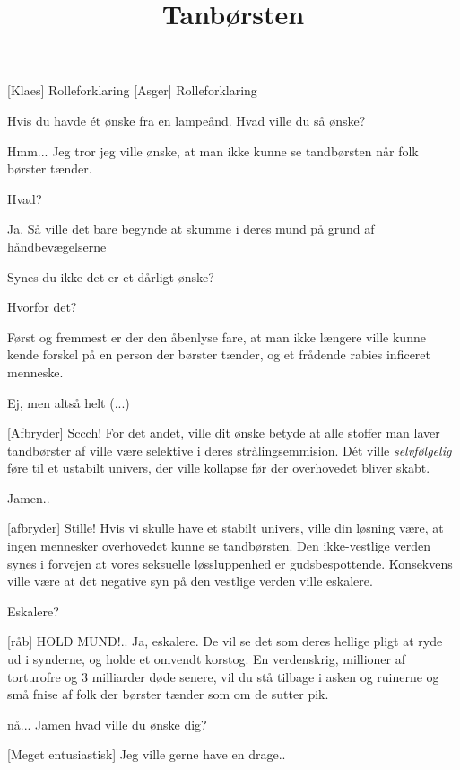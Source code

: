 \documentclass[a4paper,11pt]{article}
\title{Tanbørsten}
\begin{document}
\maketitle

\begin{roles}
    [Klaes] Rolleforklaring
    [Asger] Rolleforklaring
\end{roles}

\begin{sketch}


 Hvis du havde ét ønske fra en lampeånd. Hvad ville du så ønske?

 Hmm...  Jeg tror jeg ville ønske, at man ikke kunne se tandbørsten når folk børster tænder.

 Hvad?

 Ja. Så ville det bare begynde at skumme i deres mund på grund af håndbevægelserne 

 Synes du ikke det er et dårligt ønske?

 Hvorfor det?

 Først og fremmest er der den åbenlyse fare, at man ikke længere ville kunne kende forskel på en person der børster tænder, og et frådende rabies inficeret menneske.

 Ej, men altså helt (...)

[Afbryder] Sccch! For det andet, ville dit ønske betyde at alle stoffer man laver tandbørster af ville være selektive i deres strålingsemmision. Dét ville \emph{selvfølgelig} føre til et ustabilt univers, der ville kollapse før der overhovedet bliver skabt. 

 Jamen..

[afbryder] Stille! Hvis vi skulle have et stabilt univers, ville din løsning være, at ingen mennesker overhovedet kunne se tandbørsten. Den ikke-vestlige verden synes i forvejen at vores seksuelle løssluppenhed er gudsbespottende. Konsekvens ville være at det negative syn på den vestlige verden ville eskalere.

 Eskalere?

[råb] HOLD MUND!.. Ja, eskalere. De vil se det som deres hellige pligt at ryde ud i synderne, og  holde et omvendt korstog. En verdenskrig, millioner af torturofre og 3 milliarder døde senere, vil du stå tilbage i asken og ruinerne og små fnise af folk der børster tænder som om de sutter pik.

  nå... Jamen hvad ville du ønske dig?

 [Meget entusiastisk] Jeg ville gerne have en drage..


\end{sketch}
\end{document}
